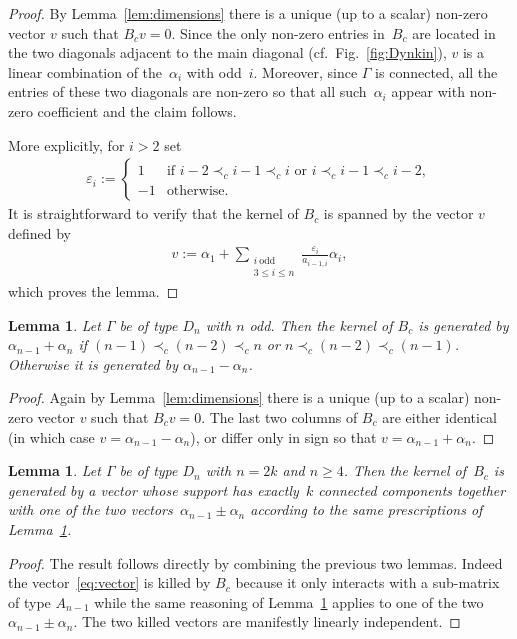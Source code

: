 \documentclass[pdftex]{sigma}
\numberwithin{equation}{section}
\newtheorem{Lemma}[Theorem]{Lemma}
\begin{document}
  \begin{proof}
    By Lemma~\ref{lem:dimensions} there is a unique (up to a scalar) non-zero vector $v$ such that $B_cv=0$.
    Since the only non-zero entries in~$B_c$ are located in the two diagonals adjacent to the main diagonal (cf.\ Fig.~\ref{fig:Dynkin}), $v$ is a linear combination of the~$\alpha_i$ with odd~$i$.
    Moreover, since $\Gamma$ is connected, all the entries of these two diagonals are non-zero so that all such~$\alpha_i$ appear with non-zero coef\/f\/icient and the claim follows.

    More explicitly, for $i>2$ set
    \begin{gather*}
      \varepsilon_i :=
      \begin{cases}
        1 & \text{if $i-2\prec_c i-1 \prec_c i$ or $i\prec_c i-1 \prec_c i-2$},\\
        -1 & \text{otherwise.}
      \end{cases}
    \end{gather*}
    It is straightforward to verify that the kernel of $B_c$ is spanned by the vector $v$ def\/ined by
    \begin{gather} \label{eq:vector}
      v := \alpha_1 + \sum_{\substack{i\ \mathrm{odd}\\ 3\le i \leq n}} \frac{\varepsilon_i}{a_{i-1,i}} \alpha_i,
    \end{gather}
    which proves the lemma.
  \end{proof}

  \begin{Lemma} \label{lem:ker_Dn_even}
    Let $\Gamma$ be of type $D_n$ with $n$ odd.
    Then the kernel of $B_c$ is generated by $\alpha_{n-1}+\alpha_n$ if $(n-1) \prec_c (n-2) \prec_c n$ or $n \prec_c (n-2) \prec_c (n-1)$.
    Otherwise it is generated by $\alpha_{n-1}-\alpha_n$.
  \end{Lemma}
  \begin{proof}
    Again by Lemma~\ref{lem:dimensions} there is a unique (up to a scalar) non-zero vector $v$ such that $B_cv=0$.
    The last two columns of $B_c$ are either identical (in which case $v=\alpha_{n-1}-\alpha_n$), or dif\/fer only in sign so that $v=\alpha_{n-1}+\alpha_n$.
  \end{proof}

  \begin{Lemma}
    Let $\Gamma$ be of type $D_n$ with $n=2k$ and $n\geq 4$.
    Then the kernel of~$B_c$ is generated by a vector whose support has exactly~$k$ connected components together with one of the two vectors~$\alpha_{n-1}\pm\alpha_n$ according to the same prescriptions of Lemma~{\rm \ref{lem:ker_Dn_even}}.
  \end{Lemma}
  \begin{proof}
    The result follows directly by combining the previous two lemmas.
    Indeed the vector~\eqref{eq:vector} is killed by $B_c$ because it only interacts with a sub-matrix of type $A_{n-1}$ while the same reasoning of Lemma~\ref{lem:ker_Dn_even} applies to one of the two $\alpha_{n-1}\pm\alpha_n$.
    The two killed vectors are manifestly linearly independent.
  \end{proof}
\end{document}
